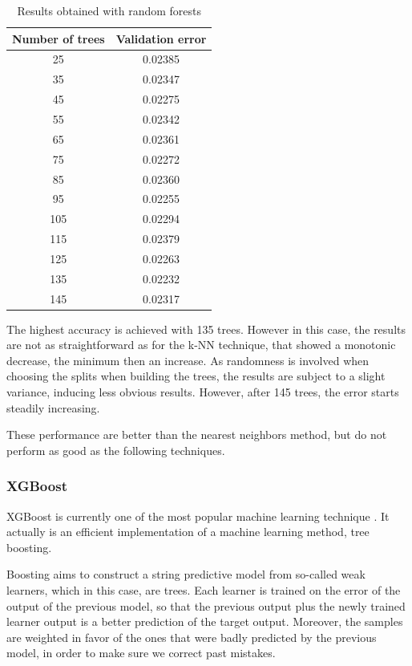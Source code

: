 \begin{table}[h]
    \centering
    \begin{tabular}{|c|c|}
        \hline
        Number of trees & Validation error \\ \hline
        25  & 0.02385 \\
        35  & 0.02347 \\
        45  & 0.02275 \\
        55  & 0.02342 \\
        65  & 0.02361 \\
        75  & 0.02272 \\
        85  & 0.02360 \\
        95  & 0.02255 \\
        105 & 0.02294 \\
        115 & 0.02379 \\
        125 & 0.02263 \\
        135 & 0.02232 \\
        145 & 0.02317 \\ \hline
    \end{tabular}
    \caption{Results obtained with random forests}
    \label{tab:trees-results}
\end{table}

The highest accuracy is achieved with 135 trees. However in this case, the results are not as straightforward as for the k-NN technique, that showed a monotonic decrease, the minimum then an increase. As randomness is involved when choosing the splits when building the trees, the results are subject to a slight variance, inducing less obvious results. However, after 145 trees, the error starts steadily increasing.

These performance are better than the nearest neighbors method, but do not perform as good as the following techniques.

\subsubsection{XGBoost}

XGBoost is currently one of the most popular machine learning technique \cite{XGBoost}. It actually is an efficient implementation of a machine learning method, tree boosting.

Boosting aims to construct a string predictive model from so-called weak learners, which in this case, are trees. Each learner is trained on the error of the output of the previous model, so that the previous output plus the newly trained learner output is a better prediction of the target output. Moreover, the samples are weighted in favor of the ones that were badly predicted by the previous model, in order to make sure we correct past mistakes.

